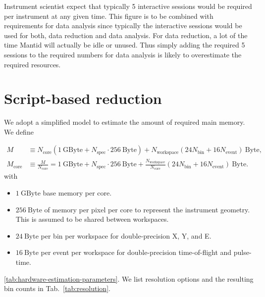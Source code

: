 \documentclass[a4paper,english,numbers=noenddot,bibliography=totoc,chapterprefix=on,DIV=12]{scrartcl}
\newcommand{\Nbin}{N_{\text{bin}}}
\newcommand{\Ncore}{N_{\text{core}}}
\newcommand{\Nevent}{N_{\text{event}}}
\newcommand{\Nspec}{N_{\text{spec}}}
\newcommand{\Mcore}{M_{\text{core}}}
\newcommand{\mantid}{Mantid\xspace}
\begin{document}
Instrument scientist expect that typically 5 interactive sessions would be required per instrument at any given time.
This figure is to be combined with requirements for data analysis since typically the interactive sessions would be used for both, data reduction and data analysis.
For data reduction, a lot of the time \mantid will actually be idle or unused.
Thus simply adding the required 5 sessions to the required numbers for data analysis is likely to overestimate the required resources.

\section{Script-based reduction}
\label{sec:script-based}

We adopt a simplified model to estimate the amount of required main memory.
We define

\begin{align}
  \label{eq:ram}
  M &\equiv \Ncore(1~\mathrm{GByte} + \Nspec \cdot 256~\mathrm{Byte}) + N_{\text{workspace}}(24\Nbin + 16\Nevent)~\mathrm{Byte},\\
  \Mcore &\equiv \frac{M}{\Ncore} = 1~\mathrm{GByte} + \Nspec \cdot 256~\mathrm{Byte} + \frac{N_{\text{workspace}}}{\Ncore}(24\Nbin + 16\Nevent)~\mathrm{Byte}.
\end{align}
with
\begin{itemize}
  \item $1~\mathrm{GByte}$ base memory per core.
  \item $256~\mathrm{Byte}$ of memory per pixel per core to represent the instrument geometry.
    This is assumed to be shared between workspaces.
  \item $24~\mathrm{Byte}$ per bin per workspace for double-precision X, Y, and E.
  \item $16~\mathrm{Byte}$ per event per workspace for double-precision time-of-flight and pulse-time.
\end{itemize}

\ref{tab:hardware-estimation-parameters}.
We list resolution options and the resulting bin counts in Tab.~\ref{tab:resolution}.
\end{document}
